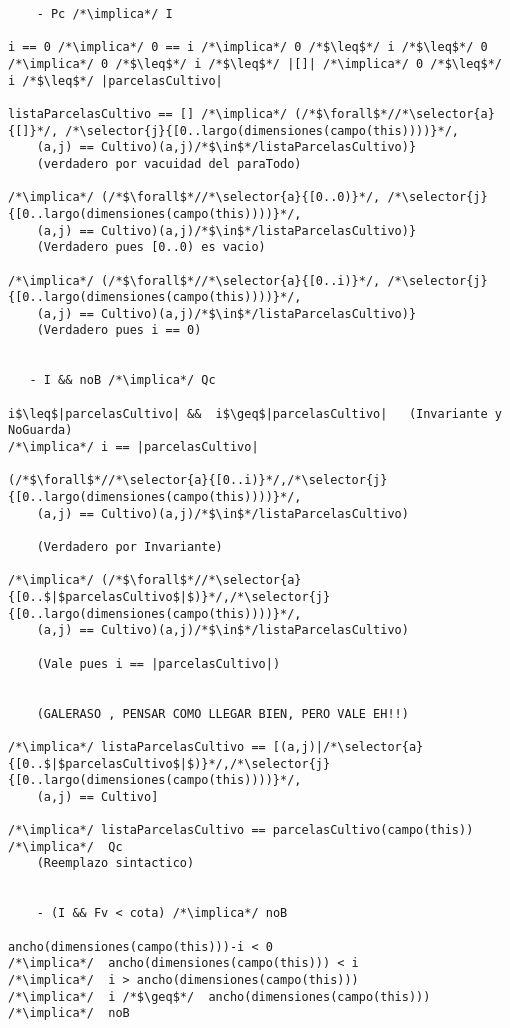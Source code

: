 \begin{lstlisting}
    - Pc /*\implica*/ I
    
i == 0 /*\implica*/ 0 == i /*\implica*/ 0 /*$\leq$*/ i /*$\leq$*/ 0
/*\implica*/ 0 /*$\leq$*/ i /*$\leq$*/ |[]| /*\implica*/ 0 /*$\leq$*/ i /*$\leq$*/ |parcelasCultivo|

listaParcelasCultivo == [] /*\implica*/ (/*$\forall$*//*\selector{a}{[]}*/, /*\selector{j}{[0..largo(dimensiones(campo(this))))}*/,
    (a,j) == Cultivo)(a,j)/*$\in$*/listaParcelasCultivo)}
    (verdadero por vacuidad del paraTodo)
    
/*\implica*/ (/*$\forall$*//*\selector{a}{[0..0)}*/, /*\selector{j}{[0..largo(dimensiones(campo(this))))}*/,
    (a,j) == Cultivo)(a,j)/*$\in$*/listaParcelasCultivo)}
	(Verdadero pues [0..0) es vacio)

/*\implica*/ (/*$\forall$*//*\selector{a}{[0..i)}*/, /*\selector{j}{[0..largo(dimensiones(campo(this))))}*/,
    (a,j) == Cultivo)(a,j)/*$\in$*/listaParcelasCultivo)}
    (Verdadero pues i == 0)
    

   - I && noB /*\implica*/ Qc
   
i$\leq$|parcelasCultivo| &&  i$\geq$|parcelasCultivo|   (Invariante y NoGuarda)
/*\implica*/ i == |parcelasCultivo|

(/*$\forall$*//*\selector{a}{[0..i)}*/,/*\selector{j}{[0..largo(dimensiones(campo(this))))}*/,
    (a,j) == Cultivo)(a,j)/*$\in$*/listaParcelasCultivo)
    
    (Verdadero por Invariante)
    
/*\implica*/ (/*$\forall$*//*\selector{a}{[0..$|$parcelasCultivo$|$)}*/,/*\selector{j}{[0..largo(dimensiones(campo(this))))}*/,
    (a,j) == Cultivo)(a,j)/*$\in$*/listaParcelasCultivo)
	
	(Vale pues i == |parcelasCultivo|)    


	(GALERASO , PENSAR COMO LLEGAR BIEN, PERO VALE EH!!)

/*\implica*/ listaParcelasCultivo == [(a,j)|/*\selector{a}{[0..$|$parcelasCultivo$|$)}*/,/*\selector{j}{[0..largo(dimensiones(campo(this))))}*/,
    (a,j) == Cultivo]

/*\implica*/ listaParcelasCultivo == parcelasCultivo(campo(this))  /*\implica*/  Qc
	(Reemplazo sintactico)
	
	
    - (I && Fv < cota) /*\implica*/ noB
    
ancho(dimensiones(campo(this)))-i < 0
/*\implica*/  ancho(dimensiones(campo(this))) < i
/*\implica*/  i > ancho(dimensiones(campo(this)))
/*\implica*/  i /*$\geq$*/  ancho(dimensiones(campo(this))) /*\implica*/  noB


\end{lstlisting}
